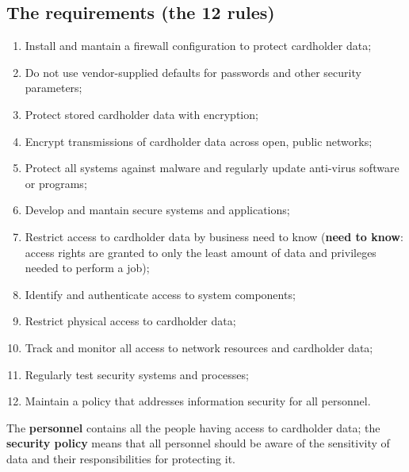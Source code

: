 \documentclass[a4paper, 10pt, titlepage]{article}
\begin{document}
\subsection{The requirements (the 12 rules)}
\begin{enumerate}
\item Install and mantain a firewall configuration to protect cardholder data;
\item Do not use vendor-supplied defaults for passwords and other security parameters;
\item Protect stored cardholder data with encryption;
\item Encrypt transmissions of cardholder data across open, public networks;
\item Protect all systems against malware and regularly update anti-virus software or programs;
\item Develop and mantain secure systems and applications;
\item Restrict access to cardholder data by business need to know (\textbf{need to know}: access rights are granted to only the least amount of data and privileges needed to perform a job);
\item Identify and authenticate access to system components;
\item Restrict physical access to cardholder data;
\item Track and monitor all access to network resources and cardholder data;
\item Regularly test security systems and processes;
\item Maintain a policy that addresses information security for all personnel.
\end{enumerate}
The \textbf{personnel} contains all the people having access to cardholder data; the \textbf{security policy} means that all personnel should be aware of the sensitivity of data and their responsibilities for protecting it.
\end{document}
